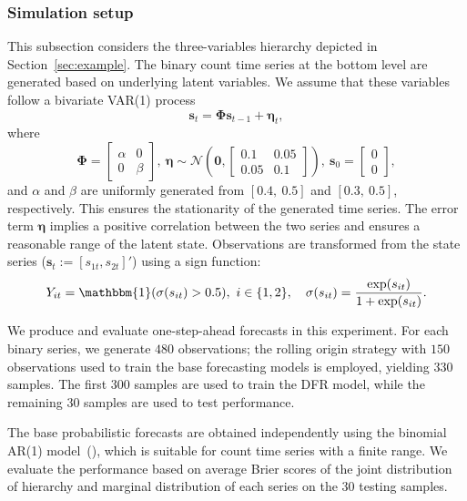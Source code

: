 \documentclass[a4paper,review,12pt,authoryear]{elsarticle}
\begin{document}
    \subsubsection{Simulation setup}
    This subsection considers the three-variables hierarchy depicted in Section~\ref{sec:example}.
    The binary count time series at the bottom level are generated based on underlying latent variables.
    We assume that these variables follow a bivariate VAR(1) process
    \[\mathbf{s}_t = \mathbf{\Phi}\mathbf{s}_{t-1}+\boldsymbol{\eta}_t,\]
    where
    \[
      \mathbf{\Phi} = \left[\begin{matrix}
        \alpha & 0 \\
        0 & \beta
      \end{matrix}\right], ~ \boldsymbol{\eta} \sim \mathcal{N}\left(\mathbf{0}, \left[\begin{matrix}
        0.1 & 0.05 \\
        0.05 & 0.1
      \end{matrix}\right]\right), ~ \mathbf{s}_{0} = \left[
        \begin{matrix}0 \\ 0\end{matrix}
      \right],
    \]
    and $\alpha$ and $\beta$ are uniformly generated from $[0.4, ~ 0.5]$ and $[0.3, ~ 0.5]$, respectively.
    This ensures the stationarity of the generated time series.
    The error term $\boldsymbol{\eta}$ implies a positive correlation between the two series and ensures a reasonable range of the latent state.
    Observations are transformed from the state series ($\mathbf{s}_{t} := [s_{1t}, s_{2t}]'$) using a sign function:
    \[
        Y_{it} = \mathbbm{1}(\sigma(s_{it}) > 0.5), ~ i\in\{1, 2\},\quad \sigma(s_{it}) = \frac{\exp(s_{it})}{1+\exp(s_{it})}.
    \]

    We produce and evaluate one-step-ahead forecasts in this experiment.
    For each binary series, we generate $480$ observations; the rolling origin strategy with $150$ observations used to train the base forecasting models is employed, yielding $330$ samples.
    The first $300$ samples are used to train the DFR model, while the remaining $30$ samples are used to test performance.

    The base probabilistic forecasts are obtained independently using the binomial AR(1) model~(\citealp{weissParameterEstimationBinomial2013}), which is suitable for count time series with a finite range.
    We evaluate the performance based on average Brier scores of the joint distribution of hierarchy and marginal distribution of each series on the $30$ testing samples.
\end{document}
